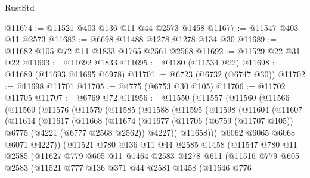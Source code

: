 \begin{lexlean}{RustStd}
\begin{coremodule}
@11674 := @11521 @403 @136 @11 @44 @2573 @1458
@11677 := @11547 @403 @11 @2573
@11682 := @6698 @11488 @1278 @1278 @134 @30
@11689 := @11682 @105 @72 @11 @1833 @1765 @2561 @2568
@11692 := @11529 @22 @31 @22
@11693 := @11692 @1833
@11695 := @4180 (@11534 @22)
@11698 := @11689 (@11693 @11695 @6978)
@11701 := @6723 (@6732 (@6747 @30))
@11702 := @11698 @11701
@11705 := @4775 (@6753 @30 @105)
@11706 := @11702 @11705
@11707 := @6769 @72
@11956 := @11550
    (@11557
      (@11560
        (@11566
          (@11569
            (@11576
              (@11579
                (@11585
                  (@11588
                    (@11595
                      (@11598
                        (@11604
                          (@11607
                            (@11614
                              (@11617
                                (@11668
                                  (@11674
                                    (@11677
                                      (@11706
                                        (@6759 (@11707 @105))
                                        @6775
                                        (@4221 (@6777 @2568 @2562))
                                        @4227))
                                    @11658)))
                              @6062
                              @6065
                              @6068
                              @6071
                              @4227))
                          (@11521
                            @780
                            @136
                            @11
                            @44
                            @2585
                            @1458
                            (@11547
                              @780
                              @11
                              @2585
                              (@11627
                                @779
                                @605
                                @11
                                @1464
                                @2583
                                @1278
                                @611
                                (@11516
                                  @779
                                  @605
                                  @2583
                                  (@11521
                                    @777
                                    @136
                                    @371
                                    @44
                                    @2581
                                    @1458
                                    (@11646
                                      @776

\end{coremodule}
\end{lexlean}
